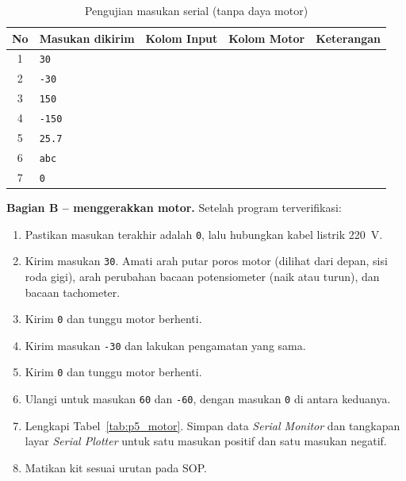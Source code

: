 \documentclass[11pt,a4paper]{article}
\begin{document}
\begin{table}[H]
	\centering
	\caption{Pengujian masukan serial (tanpa daya motor)}
	\label{tab:p5_serial}
	\begin{tabular}{|c|l|c|c|l|}
		\hline
		\textbf{No} & \textbf{Masukan dikirim} & \textbf{Kolom Input} & \textbf{Kolom Motor} & \textbf{Keterangan} \\
		\hline
		1           & \texttt{30}              &                      &                      &                     \\
		2           & \texttt{-30}             &                      &                      &                     \\
		3           & \texttt{150}             &                      &                      &                     \\
		4           & \texttt{-150}            &                      &                      &                     \\
		5           & \texttt{25.7}            &                      &                      &                     \\
		6           & \texttt{abc}             &                      &                      &                     \\
		7           & \texttt{0}               &                      &                      &                     \\
		\hline
	\end{tabular}
\end{table}

\textbf{Bagian B -- menggerakkan motor.} Setelah program terverifikasi:
\begin{enumerate}
	\item Pastikan masukan terakhir adalah \texttt{0}, lalu hubungkan kabel listrik 220~V.
	\item Kirim masukan \texttt{30}. Amati arah putar poros motor (dilihat dari depan, sisi roda gigi), arah perubahan bacaan potensiometer (naik atau turun), dan bacaan tachometer.
	\item Kirim \texttt{0} dan tunggu motor berhenti.
	\item Kirim masukan \texttt{-30} dan lakukan pengamatan yang sama.
	\item Kirim \texttt{0} dan tunggu motor berhenti.
	\item Ulangi untuk masukan \texttt{60} dan \texttt{-60}, dengan masukan \texttt{0} di antara keduanya.
	\item Lengkapi Tabel~\ref{tab:p5_motor}. Simpan data \textit{Serial Monitor} dan tangkapan layar \textit{Serial Plotter} untuk satu masukan positif dan satu masukan negatif.
	\item Matikan kit sesuai urutan pada SOP.
\end{enumerate}
\end{document}

